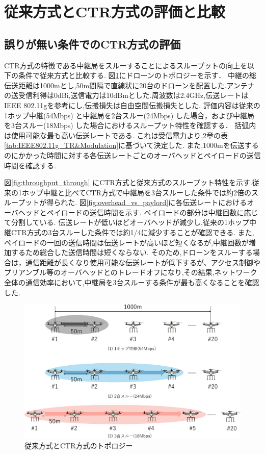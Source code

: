 \documentclass[a4paper,10.5pt]{ltjsarticle}
\begin{document}
\clearpage
\section{従来方式とCTR方式の評価と比較}
\subsection{誤りが無い条件でのCTR方式の評価}
CTR方式の特徴である中継局をスルーすることによるスループットの向上を以下の条件で従来方式と比較する.
図\ref{fig:CTR_model}にドローンのトポロジーを示す．
中継の総伝送距離は1000mとし,50m間隔で直線状に20台のドローンを配置した.アンテナの送受信利得は0dBi,送信電力は10dBmとした.周波数は2.4GHz,伝送レートはIEEE 802.11gを参考にし,伝搬損失は自由空間伝搬損失とした.
評価内容は従来の1ホップ中継(54Mbps) と中継局を2台スルー(24Mbps) した場合，および中継局を3台スルー(18Mbps) した場合におけるスループット特性を確認する．
括弧内は使用可能な最も高い伝送レートである.
これは受信電力より,2章の表\ref{tab:IEEE802.11g_TR&Modulation}に基づいて決定した.
また,1000mを伝送するのにかかった時間に対する各伝送レートごとのオーバヘッドとペイロードの送信時間を確認する.

図\ref{fig:throughput_through} にCTR方式と従来方式のスループット特性を示す.従来の1ホップ中継と比べてCTR方式で中継局を3台スルーした条件では約2倍のスループットが得られた.
図\ref{fig:overhead_vs_paylord}に各伝送レートにおけるオーバヘッドとペイロードの送信時間を示す.
ペイロードの部分は中継回数に応じて分割している.
伝送レートが低いほどオーバヘッドが減少し,従来の1ホップ中継CTR方式の3台スルーした条件では約1/4に減少することが確認できる.
また,ペイロードの一回の送信時間は伝送レートが高いほど短くなるが,中継回数が増加するため総合した送信時間は短くならない.
そのため,ドローンをスルーする場合は，通信距離が長くなり使用可能な伝送レートが低下するが、アクセス制御やプリアンブル等のオーバヘッドとのトレードオフになり,その結果,ネットワーク全体の通信効率において,中継局を3台スルーする条件が最も高くなることを確認した.


\begin{figure}[H]
  \centering
  \includegraphics[width=\linewidth]{CTR_model.pdf} %
  \caption{従来方式とCTR方式のトポロジー}
  \label{fig:CTR_model} %
\end{figure}
\end{document}
